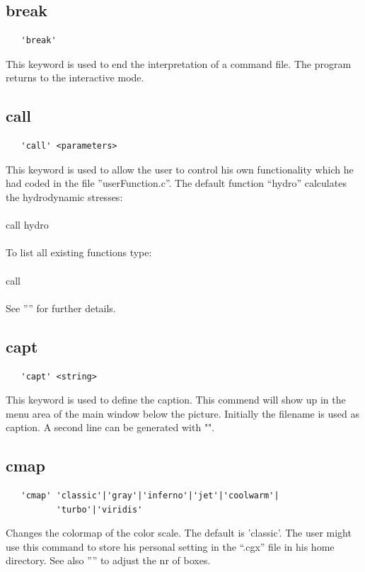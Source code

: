 \documentclass{article}
\begin{document}
\subsection{\label{break}break}
\begin{verbatim}
   'break'
\end{verbatim}
This keyword is used to end the interpretation of a command file. The program returns to the interactive mode.

\subsection{\label{call}call}
\begin{verbatim}
   'call' <parameters>
\end{verbatim}
This keyword is used to allow the user to control his own functionality which he had coded in the file ''userFunction.c''. The default function ``hydro'' calculates the hydrodynamic stresses:\\\\call hydro\\\\To list all existing functions type:\\\\call\\\\See '''' for further details. 

\subsection{\label{capt}capt}
\begin{verbatim}
   'capt' <string> 
\end{verbatim}
This keyword is used to define the caption. This commend will show up in the
menu area of the main window below the picture. Initially the filename is used
as caption. A second line can be generated with "".

\subsection{\label{cmap}cmap}
\begin{verbatim}
   'cmap' 'classic'|'gray'|'inferno'|'jet'|'coolwarm'|
          'turbo'|'viridis'
\end{verbatim}
Changes the colormap of the color scale. The default is 'classic'. The user might use this command to store his personal setting in the ``.cgx'' file in his home directory. See also '''' to adjust the nr of boxes.
\end{document}
